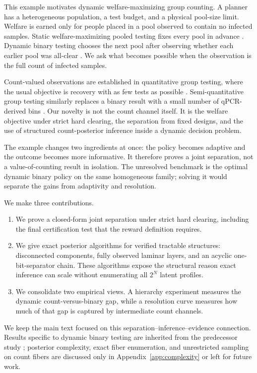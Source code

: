 \documentclass[11pt]{article}
\begin{document}
This example motivates dynamic welfare-maximizing group counting. A planner has
a heterogeneous population, a test budget, and a physical pool-size limit.
Welfare is earned only for people placed in a pool observed to contain no
infected samples. Static welfare-maximizing pooled testing fixes every pool in
advance \cite{finster2023}. Dynamic binary testing chooses the next pool after
observing whether each earlier pool was all-clear \cite{lopez2026}. We ask what
becomes possible when the observation is the full count of infected samples.

Count-valued observations are established in quantitative group testing, where
the usual objective is recovery with as few tests as possible
\cite{karimi2019}. Semi-quantitative group testing similarly replaces a binary
result with a small number of qPCR-derived bins \cite{nambiar2023}. Our novelty
is not the count channel itself. It is the welfare objective under strict hard
clearing, the separation from fixed designs, and the use of structured
count-posterior inference inside a dynamic decision problem.

The example changes two ingredients at once: the policy becomes adaptive and
the outcome becomes more informative. It therefore proves a joint separation,
not a value-of-counting result in isolation. The unresolved benchmark is the
optimal dynamic binary policy on the same homogeneous family; solving it would
separate the gains from adaptivity and resolution.

We make three contributions.

\begin{enumerate}
  \item We prove a closed-form joint separation under strict hard clearing,
  including the final certification test that the reward definition requires.
  \item We give exact posterior algorithms for verified tractable structures:
  disconnected components, fully observed laminar layers, and an acyclic
  one-bit-separator chain. These algorithms expose the structural reason exact
  inference can scale without enumerating all $2^N$ latent profiles.
  \item We consolidate two empirical views. A hierarchy experiment measures the
  dynamic count-versus-binary gap, while a resolution curve measures how much
  of that gap is captured by intermediate count channels.
\end{enumerate}

We keep the main text focused on this separation--inference--evidence
connection. Results specific to dynamic binary testing are inherited from the
predecessor study \cite{lopez2026}; posterior complexity, exact fiber
enumeration, and unrestricted sampling on count fibers are discussed only in
Appendix~\ref{app:complexity} or left for future work.
\end{document}

